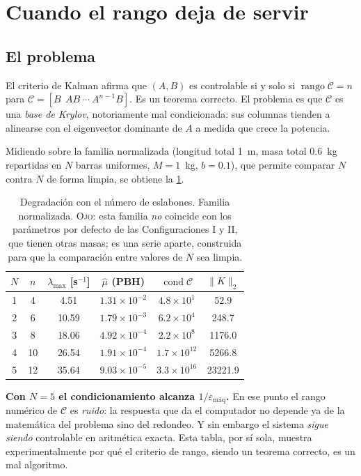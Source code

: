 \documentclass[11pt,letterpaper]{article}
\theoremstyle{definition}
\theoremstyle{plain}
\theoremstyle{remark}
\DeclareMathOperator{\rank}{rango}
\newcommand{\calC}{\mathcal{C}}
\begin{document}
\section{Cuando el rango deja de servir}
\label{sec:condicionamiento}

\subsection{El problema}

El criterio de Kalman afirma que $(A,B)$ es controlable si y solo si
$\rank\calC=n$ para $\calC=[B\ \ AB\ \cdots\ A^{n-1}B]$. Es un teorema correcto.
El problema es que $\calC$ es una \emph{base de Krylov}, notoriamente mal
condicionada: sus columnas tienden a alinearse con el eigenvector dominante de
$A$ a medida que crece la potencia.

Midiendo sobre la familia normalizada (longitud total 1~m, masa total 0.6~kg
repartidas en $N$ barras uniformes, $M=1$~kg, $b=0.1$), que permite comparar $N$
contra $N$ de forma limpia, se obtiene la \cref{tab:degradacion}.

\begin{table}[htbp]
  \centering\small
  \caption{Degradación con el número de eslabones. Familia normalizada.
  \textsc{Ojo:} esta familia \emph{no} coincide con los parámetros por defecto
  de las Configuraciones I y II, que tienen otras masas; es una serie aparte,
  construida para que la comparación entre valores de $N$ sea limpia.}
  \label{tab:degradacion}
  \begin{tabular}{@{}cccccc@{}}
    \toprule
    $N$ & $n$ & $\lambda_{\max}$ [s$^{-1}$] & $\hat\mu$ (PBH) & $\operatorname{cond}\calC$ & $\|K\|_2$\\
    \midrule
    1 & 4  & 4.51  & $1.31\times10^{-2}$ & $4.8\times10^{1}$  & 52.9\\
    2 & 6  & 10.59 & $1.79\times10^{-3}$ & $6.2\times10^{4}$  & 248.7\\
    3 & 8  & 18.06 & $4.92\times10^{-4}$ & $2.2\times10^{8}$  & 1176.0\\
    4 & 10 & 26.54 & $1.91\times10^{-4}$ & $1.7\times10^{12}$ & 5266.8\\
    5 & 12 & 35.64 & $9.03\times10^{-5}$ & $3.3\times10^{16}$ & 23221.9\\
    \bottomrule
  \end{tabular}
\end{table}

\begin{alerta}
\small
\textbf{Con $N=5$ el condicionamiento alcanza $1/\varepsilon_{\text{máq}}$.} En
ese punto el rango numérico de $\calC$ es \emph{ruido}: la respuesta que da el
computador no depende ya de la matemática del problema sino del redondeo. Y sin
embargo el sistema \emph{sigue siendo} controlable en aritmética exacta. Esta
tabla, por sí sola, muestra experimentalmente por qué el criterio de rango,
siendo un teorema correcto, es un mal algoritmo.
\end{alerta}
\end{document}
